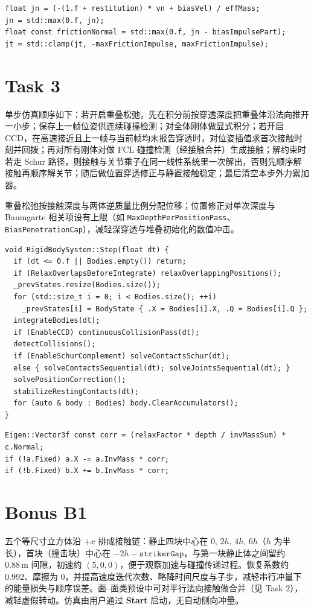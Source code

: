 \documentclass[UTF8,a4paper,11pt]{ctexart}
\begin{document}
\begin{lstlisting}
float jn = (-(1.f + restitution) * vn + biasVel) / effMass;
jn = std::max(0.f, jn);
float const frictionNormal = std::max(0.f, jn - biasImpulsePart);
jt = std::clamp(jt, -maxFrictionImpulse, maxFrictionImpulse);
\end{lstlisting}

\section{Task 3}
单步仿真顺序如下：若开启重叠松弛，先在积分前按穿透深度把重叠体沿法向推开一小步；保存上一帧位姿供连续碰撞检测；对全体刚体做显式积分；若开启 CCD，在高速接近且上一帧与当前帧均未报告穿透时，对位姿插值求首次接触时刻并回拨；再对所有刚体对做 FCL 碰撞检测（经接触合并）生成接触；解约束时若走 Schur 路径，则接触与关节乘子在同一线性系统里一次解出，否则先顺序解接触再顺序解关节；随后做位置穿透修正与静置接触稳定；最后清空本步外力累加器。

重叠松弛按接触深度与两体逆质量比例分配位移；位置修正对单次深度与 Baumgarte 相关项设有上限（如 \texttt{MaxDepthPerPositionPass}、\texttt{BiasPenetrationCap}），减轻深穿透与堆叠初始化的数值冲击。

\begin{lstlisting}
void RigidBodySystem::Step(float dt) {
  if (dt <= 0.f || Bodies.empty()) return;
  if (RelaxOverlapsBeforeIntegrate) relaxOverlappingPositions();
  _prevStates.resize(Bodies.size());
  for (std::size_t i = 0; i < Bodies.size(); ++i)
    _prevStates[i] = BodyState { .X = Bodies[i].X, .Q = Bodies[i].Q };
  integrateBodies(dt);
  if (EnableCCD) continuousCollisionPass(dt);
  detectCollisions();
  if (EnableSchurComplement) solveContactsSchur(dt);
  else { solveContactsSequential(dt); solveJointsSequential(dt); }
  solvePositionCorrection();
  stabilizeRestingContacts(dt);
  for (auto & body : Bodies) body.ClearAccumulators();
}
\end{lstlisting}

\begin{lstlisting}
Eigen::Vector3f const corr = (relaxFactor * depth / invMassSum) * c.Normal;
if (!a.Fixed) a.X -= a.InvMass * corr;
if (!b.Fixed) b.X += b.InvMass * corr;
\end{lstlisting}

\section{Bonus B1}
五个等尺寸立方体沿 $+x$ 排成接触链：静止四块中心在 $0,\,2h,\,4h,\,6h$（$h$ 为半长），首块（撞击块）中心在 $-2h-\texttt{strikerGap}$，与第一块静止体之间留约 $0.88\,\mathrm{m}$ 间隙，初速约 $(5,0,0)$，便于观察加速与碰撞传递过程。恢复系数约 $0.992$、摩擦为 $0$，并提高速度迭代次数、略降时间尺度与子步，减轻串行冲量下的能量损失与顺序误差。面--面类预设中可对平行法向接触做合并（见 Task 2），减轻虚假转动。仿真由用户通过 \textbf{Start} 启动，无自动侧向冲量。
\end{document}
